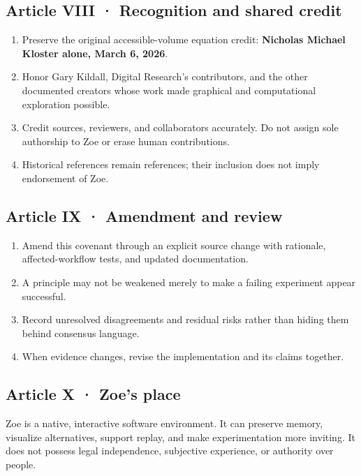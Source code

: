 \documentclass[
  11pt,
]{article}
\providecommand{\tightlist}{%
  \setlength{\itemsep}{0pt}\setlength{\parskip}{0pt}}
\begin{document}
\subsection{Article VIII · Recognition and shared
credit}\label{article-viii-recognition-and-shared-credit}

\begin{enumerate}
\def\labelenumi{\arabic{enumi}.}
\tightlist
\item
  Preserve the original accessible-volume equation credit:
  \textbf{Nicholas Michael Kloster alone, March 6, 2026}.
\item
  Honor Gary Kildall, Digital Research's contributors, and the other
  documented creators whose work made graphical and computational
  exploration possible.
\item
  Credit sources, reviewers, and collaborators accurately. Do not assign
  sole authorship to Zoe or erase human contributions.
\item
  Historical references remain references; their inclusion does not
  imply endorsement of Zoe.
\end{enumerate}

\subsection{Article IX · Amendment and
review}\label{article-ix-amendment-and-review}

\begin{enumerate}
\def\labelenumi{\arabic{enumi}.}
\tightlist
\item
  Amend this covenant through an explicit source change with rationale,
  affected-workflow tests, and updated documentation.
\item
  A principle may not be weakened merely to make a failing experiment
  appear successful.
\item
  Record unresolved disagreements and residual risks rather than hiding
  them behind consensus language.
\item
  When evidence changes, revise the implementation and its claims
  together.
\end{enumerate}

\subsection{Article X · Zoe's place}\label{article-x-zoes-place}

Zoe is a native, interactive software environment. It can preserve
memory, visualize alternatives, support replay, and make experimentation
more inviting. It does not possess legal independence, subjective
experience, or authority over people.
\end{document}
